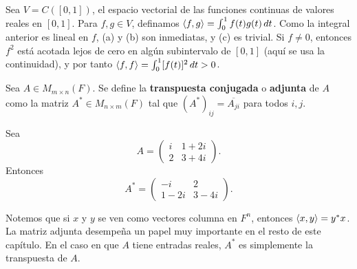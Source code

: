 \documentclass[12pt,a4paper]{book}
\begin{document}
    \begin{ejemplo}
        Sea $V=C([0,1])$, el espacio vectorial de las funciones continuas de valores reales en $[0,1]$. Para $f,g\in V$, definamos $\left\langle f, g \right\rangle=\int_0^1 f(t)g(t)\,dt$. Como la integral anterior es lineal en $f$, (a) y (b) son inmediatas, y (c) es trivial. Si $f\neq 0$, entonces $f^2$ está acotada lejos de cero en algún subintervalo de $[0,1]$ (aquí se usa la continuidad), y por tanto $\left\langle f, f \right\rangle=\int_0^1[f(t)]^2\,dt>0$.
    \end{ejemplo}

    \begin{definicion}
        Sea $A\in M_{m\times n}(F)$. Se define la \textbf{transpuesta conjugada} o \textbf{adjunta} de $A$ como la matriz $A^*\in M_{n\times m}(F)$ tal que $(A^*)_{ij}=\overline{A_{ji}}$ para todos $i,j$.
    \end{definicion}

    \begin{ejemplo}
        Sea
        \begin{equation*}
            A=\begin{pmatrix}i&1+2i\\2&3+4i\end{pmatrix}.
        \end{equation*}
        Entonces
        \begin{equation*}
            A^*=\begin{pmatrix}-i&2\\1-2i&3-4i\end{pmatrix}.
        \end{equation*}
    \end{ejemplo}

    Notemos que si $x$ y $y$ se ven como vectores columna en $F^n$, entonces $\left\langle x, y \right\rangle=y^*x$. La matriz adjunta desempeña un papel muy importante en el resto de este capítulo. En el caso en que $A$ tiene entradas reales, $A^*$ es simplemente la transpuesta de $A$.
\end{document}
